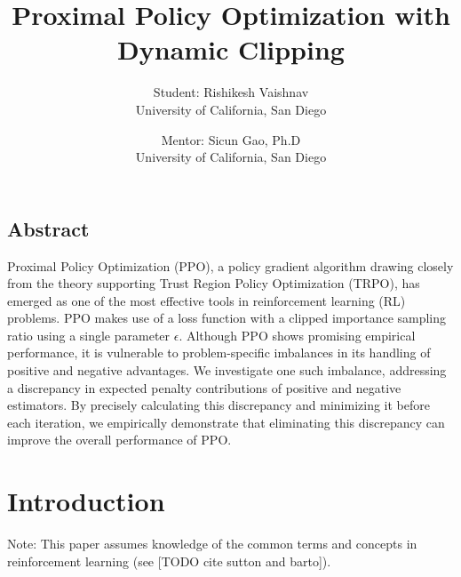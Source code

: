 \documentclass[letterpaper,twocolumn,10pt]{article}
\begin{document}
\date{}

\title{\Large \bf Proximal Policy Optimization with Dynamic Clipping}

\author{
{\rm Student: Rishikesh Vaishnav}\\
University of California, San Diego
\and
{\rm Mentor: Sicun Gao, Ph.D}\\
University of California, San Diego
}

\maketitle

\thispagestyle{empty}


\subsection*{Abstract}
Proximal Policy Optimization (PPO), a policy gradient algorithm drawing closely
from the theory supporting Trust Region Policy Optimization (TRPO), has emerged
as one of the most effective tools in reinforcement learning (RL) problems. PPO
makes use of a loss function with a clipped importance sampling ratio using a
single parameter $\epsilon$. Although PPO shows promising empirical
performance, it is vulnerable to problem-specific imbalances in its handling of
positive and negative advantages. We investigate one such imbalance, addressing
a discrepancy in expected penalty contributions of positive and negative
estimators. By precisely calculating this discrepancy and minimizing it before
each iteration, we empirically demonstrate that eliminating this discrepancy
can improve the overall performance of PPO.

\section{Introduction}

Note: This paper assumes knowledge of the common terms and concepts in
reinforcement learning (see [TODO cite sutton and barto]).
\end{document}
